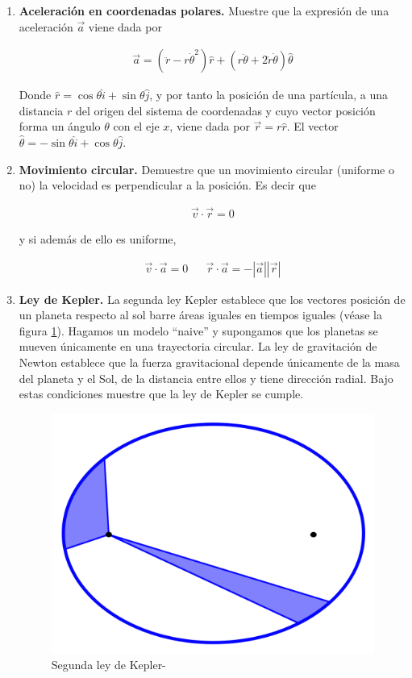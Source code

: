 \documentclass[11pt,letterpaper]{article}
\begin{document}
\begin{multicols}{2}
\begin{enumerate}
		\item \textbf{Aceleración en coordenadas polares.} Muestre que la expresión de una aceleración $\vec{a}$ viene dada por 
		
		\begin{align*}
			\vec{a} = (\ddot{r} - r \dot{\theta}^2) \hat{r} + (r \ddot{\theta} + 2 \dot{r}\dot{\theta})\hat{\theta}
		\end{align*}
		
		Donde $\hat{r} = \cos \theta \hat{i} + \sin \theta \hat{j}$, y por tanto la posición de una partícula, a una distancia $r$ del origen del sistema de coordenadas y cuyo vector posición forma un ángulo $\theta$ con el eje $x$, viene dada por $\vec{r} = r \hat{r}$. El vector $\hat{\theta} = -\sin \theta \hat{i} + \cos \theta \hat{j}$.

		\item \textbf{Movimiento circular.} Demuestre que un movimiento circular (uniforme o no) la velocidad es perpendicular a la posición. Es decir que 

		\begin{align*}
			\vec{v}\cdot \vec{r} = 0
		\end{align*}

		y si además de ello es uniforme, 

		\begin{align*}
			\vec{v}\cdot\vec{a} = 0 && \vec{r} \cdot \vec{a} = -|\vec{a}||\vec{r}|
		\end{align*}

		\item \textbf{Ley de Kepler.} La segunda ley Kepler establece que los vectores posición de un planeta respecto al sol barre áreas iguales en tiempos iguales (véase la figura \ref{fig:kepler}). Hagamos un modelo ``naive'' y supongamos que los planetas se mueven únicamente en una trayectoria circular. La ley de gravitación de Newton establece que la fuerza gravitacional depende únicamente de la masa del planeta y el Sol, de la distancia entre ellos y tiene dirección radial. Bajo estas condiciones muestre que la ley de Kepler se cumple.
		
		\begin{figure}[H]
			\centering
			\includegraphics[width = 0.7\linewidth]{Figures/kepler}
			\caption{Segunda ley de Kepler-}
			\label{fig:kepler}
		\end{figure}
		

\end{enumerate}
\end{multicols}
\end{document}
